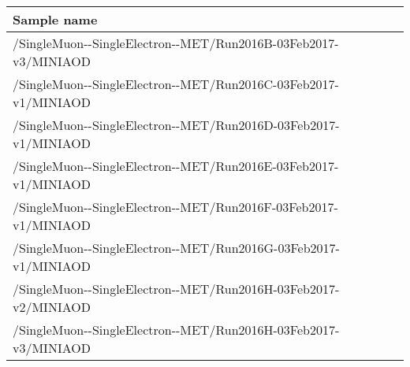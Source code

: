 \footnotesize
\begin{tabular}{lrr}
  \hline
  \textbf{Sample name} \\
  \hline
  \ttfamily/SingleMuon-{}-SingleElectron-{}-MET/Run2016B-03Feb2017-v3/MINIAOD \\
  \ttfamily/SingleMuon-{}-SingleElectron-{}-MET/Run2016C-03Feb2017-v1/MINIAOD \\
  \ttfamily/SingleMuon-{}-SingleElectron-{}-MET/Run2016D-03Feb2017-v1/MINIAOD \\
  \ttfamily/SingleMuon-{}-SingleElectron-{}-MET/Run2016E-03Feb2017-v1/MINIAOD \\
  \ttfamily/SingleMuon-{}-SingleElectron-{}-MET/Run2016F-03Feb2017-v1/MINIAOD \\
  \ttfamily/SingleMuon-{}-SingleElectron-{}-MET/Run2016G-03Feb2017-v1/MINIAOD \\
  \ttfamily/SingleMuon-{}-SingleElectron-{}-MET/Run2016H-03Feb2017-v2/MINIAOD \\
  \ttfamily/SingleMuon-{}-SingleElectron-{}-MET/Run2016H-03Feb2017-v3/MINIAOD \\
  \hline
\end{tabular}
